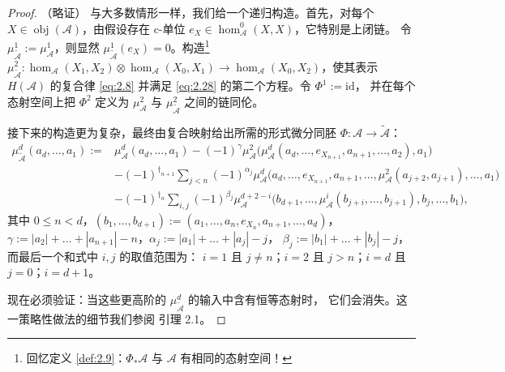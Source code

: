 \begin{proof}（略证）
与大多数情形一样，我们给一个递归构造。首先，对每个 $X\in\operatorname{obj}
(\mathcal A)$，由假设存在 c-单位 $e_X\in\hom^0_{\mathcal A}(X,X)$，它特别是上闭链。
令 $\mu^1_{\tilde{\mathcal A}}:=\mu^1_{\mathcal A}$，则显然
$\mu^1_{\tilde{\mathcal A}}(e_X)=0$。构造\footnote{回忆定义 \ref{def:2.9}：$\Phi_*\mathcal A$
与 $\mathcal A$ 有相同的态射空间！}
$\mu^2_{\tilde{\mathcal A}}:\hom_{\mathcal A}(X_1,X_2)\otimes\hom_{\mathcal A}
(X_0,X_1)\to\hom_{\mathcal A}(X_0,X_2)$，使其表示 $H(\mathcal A)$ 的复合律
\eqref{eq:2.8} 并满足 \eqref{eq:2.28} 的第二个方程。令 $\Phi^1:=\mathrm{id}$，
并在每个态射空间上把 $\Phi^2$ 定义为 $\mu^2_{\mathcal A}$ 与
$\mu^2_{\tilde{\mathcal A}}$ 之间的链同伦。

接下来的构造更为复杂，最终由复合映射给出所需的形式微分同胚
$\Phi:\mathcal A\to\tilde{\mathcal A}$：
\[
  \begin{aligned}
    \mu^d_{\tilde{\mathcal A}}(a_d,\dots,a_1):={}&\mu^d_{\mathcal A}(a_d,\dots,a_1)
    -(-1)^{\gamma}\mu^2_{\mathcal A}\bigl(\mu^d_{\mathcal A}(a_d,\dots,
    e_{X_{n+1}},a_{n+1},\dots,a_2),a_1\bigr)\\
    &-(-1)^{\dagger_{n+1}}\sum_{j<n}(-1)^{\alpha_j}\mu^d_{\mathcal A}\bigl(
    a_d,\dots,e_{X_{n+1}},a_{n+1},\dots,\mu^2_{\mathcal A}(a_{j+2},a_{j+1}),
    \dots,a_1\bigr)\\
    &-(-1)^{\dagger_n}\sum_{i,j}(-1)^{\beta_j}\mu^{d+2-i}_{\mathcal A}\bigl(
    b_{d+1},\dots,\mu^i_{\mathcal A}(b_{j+i},\dots,b_{j+1}),b_j,\dots,b_1\bigr),
  \end{aligned}
\]
其中 $0\le n<d$，$(b_1,\dots,b_{d+1}):=(a_1,\dots,a_n,e_{X_n},a_{n+1},\dots,a_d)$，
$\gamma:=|a_2|+\dots+|a_{n+1}|-n$，$\alpha_j:=|a_1|+\dots+|a_j|-j$，
$\beta_j:=|b_1|+\dots+|b_j|-j$，而最后一个和式中 $i,j$ 的取值范围为：
$i=1$ 且 $j\ne n$；$i=2$ 且 $j>n$；$i=d$ 且 $j=0$；$i=d+1$。

现在必须验证：当这些更高阶的 $\mu^d_{\tilde{\mathcal A}}$ 的输入中含有恒等态射时，
它们会消失。这一策略性做法的细节我们参阅 \cite{Sei08} 引理 2.1。
\end{proof}

